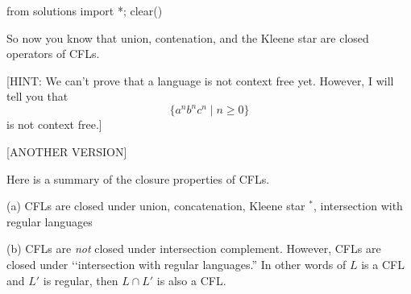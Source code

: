 \begin{python0}
from solutions import *; clear()
\end{python0}







\newpage
So now you know that union, contenation, and the Kleene star are closed 
operators of CFLs.



[HINT: We can't prove that a language is not context free yet.
However, I will tell you that 
\[
\{a^n b^n c^n \mid n \geq 0\}
\]
is not context free.]







[ANOTHER VERSION]

\begin{prop} Here is a summary of the closure properties of CFLs.
 \begin{tightlist}
  \item[(a)] CFLs are closed under union, concatenation, Kleene star
  ${}^*$, intersection with regular languages
  \item[(b)] CFLs are \textit{ not} closed under intersection
  complement.
  However, CFLs are closed under \lq\lq intersection with
  regular languages.''
  In other words of $L$ is a CFL and $L'$ is regular,
  then $L \cap L'$ is also a CFL.
 \end{tightlist}
\end{prop}

